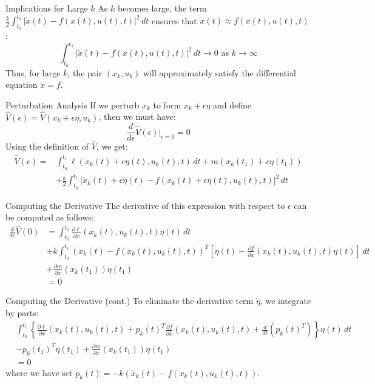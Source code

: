 \documentclass[10pt]{beamer}
\begin{document}
\begin{frame}[fragile]{Implications for Large \( k \)}
  As \( k \) becomes large, the term \( \frac{k}{2} \int_{t_0}^{t_1} |\dot{x}(t) - f(x(t), u(t), t)|^2 \, dt \) ensures that \( \dot{x}(t) \approx f(x(t), u(t), t) \):
  \[
    \int_{t_0}^{t_1} |\dot{x}(t) - f(x(t), u(t), t)|^2 \, dt \rightarrow 0 \text{ as } k \rightarrow \infty
  \]
  Thus, for large \( k \), the pair \( (x_k, u_k) \) will approximately satisfy the differential equation \( \dot{x} = f \).
\end{frame}
  
\begin{frame}[fragile]{Perturbation Analysis}
  If we perturb \( x_k \) to form \( x_k + \epsilon \eta \) and define \( \hat{V}(\epsilon) = \hat{V}(x_k + \epsilon \eta, u_k) \), then we must have:
  \[
  \frac{d}{d\epsilon} \hat{V}(\epsilon) \bigg|_{\epsilon=0} = 0
  \]
  Using the definition of \( \hat{V} \), we get:
  \[
  \begin{aligned}
    \hat{V}(\epsilon) = &\int_{t_0}^{t_1} \ell(x_k(t) + \epsilon \eta(t), u_k(t), t) \, dt + m(x_k(t_1) + \epsilon \eta(t_1)) \\
    &+ \frac{k}{2} \int_{t_0}^{t_1} |\dot{x}_k(t) + \epsilon \dot{\eta}(t) - f(x_k(t) + \epsilon \eta(t), u_k(t), t)|^2 \, dt
  \end{aligned}
  \]
\end{frame}
  
\begin{frame}[fragile]{Computing the Derivative}
  The derivative of this expression with respect to \( \epsilon \) can be computed as follows:
  \[
    \begin{aligned}
      \frac{d}{d\epsilon} \hat{V}(0) &= \int_{t_0}^{t_1} \frac{\partial \ell}{\partial x} (x_k(t), u_k(t), t) \eta(t) \, dt \\
      &+ k \int_{t_0}^{t_1} (\dot{x}_k(t) - f(x_k(t), u_k(t), t))^T [\dot{\eta}(t) - \frac{\partial f}{\partial x} (x_k(t), u_k(t), t) \eta(t)] \, dt \\
      &+ \frac{\partial m}{\partial x} (x_k(t_1)) \eta(t_1) \\
      & = 0
    \end{aligned}
  \]
\end{frame}
  
\begin{frame}[fragile]{Computing the Derivative (cont.)}
  To eliminate the derivative term \( \dot{\eta} \), we integrate by parts:
  \[
  \begin{aligned}
    &\int_{t_0}^{t_1} \left\{ \frac{\partial \ell}{\partial x} (x_k(t), u_k(t), t) + p_k(t)^T \frac{\partial f}{\partial x} (x_k(t), u_k(t), t) + \frac{d}{dt} \left( p_k(t)^T \right) \right\} \eta(t) \, dt \\
    &- p_k(t_1)^T \eta(t_1) + \frac{\partial m}{\partial x} (x_k(t_1)) \eta(t_1) \\
    & = 0
  \end{aligned}
  \]
  where we have set \( p_k(t) = -k (\dot{x}_k(t) - f(x_k(t), u_k(t), t)) \).
\end{frame}
\end{document}
